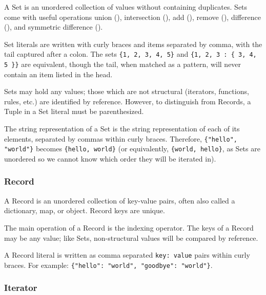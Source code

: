 A Set is an unordered collection of values without containing duplicates.
Sets come with useful operations union (\op{|}), intersection (\op{\&}),
add (\op{+}), remove (\op{-}), difference (\op{/}), and symmetric
difference (\op{\textasciicircum}).

Set literals are written with curly braces and items separated by comma,
with the tail captured after a colon. The sets \texttt{\{1, 2, 3, 4, 5\}}
and \texttt{\{1, 2, 3 : \{ 3, 4, 5 \}\}} are equivalent, though the tail,
when matched as a pattern, will never contain an item listed in the head.

Sets may hold any values; those which are not structural (iterators,
functions, rules, etc.) are identified by reference. However, to
distinguish from Records, a Tuple in a Set literal must be parenthesized.

The string representation of a Set is the string representation of
each of its elements, separated by commas within curly braces. Therefore,
\texttt{\{"hello", "world"\}} becomes \texttt{\{hello, world\}} (or
equivalently, \texttt{\{world, hello\}}, as Sets are unordered so we
cannot know which order they will be iterated in).

\subsubsection{Record}

A Record is an unordered collection of key-value pairs, often also called
a dictionary, map, or object. Record keys are unique.

The main operation of a Record is the indexing operator. The keys of a
Record may be any value; like Sets, non-structural values will be compared
by reference.

A Record literal is written as comma separated \texttt{key: value} pairs
within curly braces. For example: \texttt{\{"hello": "world", "goodbye": "world"\}}.

\subsubsection{Iterator}
